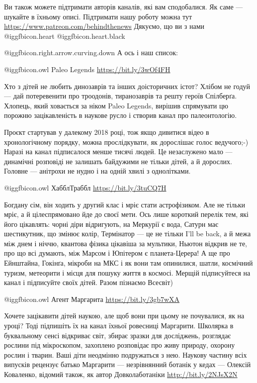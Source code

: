 Ви також можете підтримати авторів каналів, які вам сподобалися. Як саме —
шукайте в їхньому описі. Підтримати нашу роботу можна тут
 \url{https://www.patreon.com/behindthenews} Дякуємо, що ви з нами @igg{fbicon.heart} @igg{fbicon.heart.black} 

@igg{fbicon.right.arrow.curving.down} А ось і наш список:

 @igg{fbicon.owl} Paleo Legends \url{https://bit.ly/3wOf4FH}

Хто з дітей не любить динозаврів та інших доісторичних істот? Хлібом не годуй — дай потеревенити про троодонів, тиранозаврів та решту героїв Спілберґа. Хлопець, який ховається за ніком Paleo Legends, вирішив спрямувати цю порожню зацікавленість в наукове русло і створив канал про палеонтологію.

Проєкт стартував у далекому 2018 році, тож якщо дивитися відео в хронологічному порядку, можна прослідкувати, як дорослішає голос ведучого;-) Наразі на канал підписалося менше тисячі людей. Це незаслужено мало — динамічні розповіді не залишать байдужими не тільки дітей, а й дорослих. Головне — анітрохи не нудно і на одній хвилі з однолітками.

 @igg{fbicon.owl} ХабблТраббл \url{https://bit.ly/3tuCQ7H}

Богдану сім, він ходить у другий клас і мріє стати астрофізиком. Але не тільки
мріє, а й цілеспрямовано йде до своєї мети. Ось лише короткий перелік тем, які
його цікавлять: чорні діри відригують, на Меркурії є вода, Сатурн має
шестикутник, що змінює колір, Термінатор — це не тільки I'll be back, а й межа
між днем і ніччю, квантова фізика цікавіша за мультики, Ньютон відкрив не те,
про що всі думають, між Марсом і Юпітером є планета-Церера! А ще про Ейнштайна,
Гокінґа, мікроби на МКС і як вони там опинилися, шатли, космічний туризм,
метеорити і місця для пошуку життя в космосі. Мерщій підписуйтеся на канал і
підписуйте своїх дітей. Разом пізнаємо Всесвіт)

 @igg{fbicon.owl} Агент Маргарита \url{https://bit.ly/3gb7wXA}

Хочете зацікавити дітей наукою, але щоб вони при цьому не почувалися, як на уроці? Тоді підпишіть їх на канал їхньої ровесниці Маргарити. Школярка в буквальному сенсі відкриває світ, збирає зразки для досліджень, розглядає рослини під мікроскопом, захоплено розповідає про живу природу, охорону рослин і тварин. Ваші діти неодмінно подружаться з нею. Наукову частину всіх випусків рецензує батько Маргарити — незрівнянний ботанік у кедах — Олексій Коваленко, відомий також, як автор Довколаботаніки \url{http://bit.ly/2NJsX2N}

